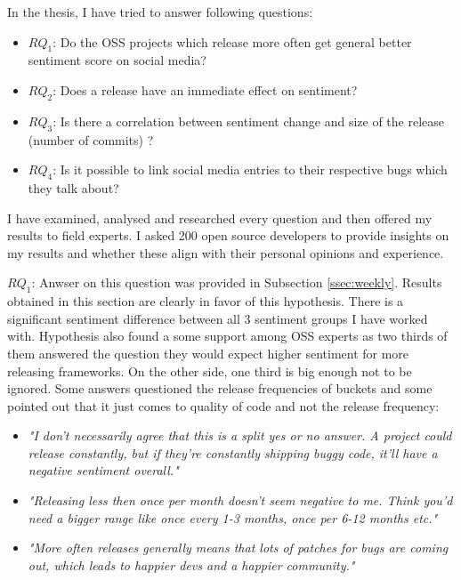 
In the thesis, I have tried to answer following questions:
\begin{itemize}
\item{\textbf{$RQ_{1}$}: Do the OSS projects which release more often get general better sentiment score on social media?}
\item{\textbf{$RQ_{2}$}: Does a release have an immediate effect on sentiment?}
\item{\textbf{$RQ_{3}$}: Is there a correlation between sentiment change and size of the release (number of commits) ?}
\item{\textbf{$RQ_{4}$}: Is it possible to link social media entries to their respective bugs which they talk about?}
\end{itemize}

I have examined, analysed and researched every question and then offered my results to field experts. I asked 200 open source developers to provide insights on my results and whether these align with their personal opinions and experience.

\textbf{$RQ_{1}$}: Anwser on this question was provided in Subsection  \ref{ssec:weekly}. Results obtained in this section are clearly in favor of this hypothesis. There is a significant sentiment difference between all 3 sentiment groups I have worked with. Hypothesis also found a some support among OSS experts as two thirds of them answered the question they would expect higher sentiment for more releasing frameworks. On the other side, one third is big enough not to be ignored. Some answers questioned the release frequencies of buckets and some pointed out that it just comes to quality of code and not the release frequency:

\begin{itemize}
\item \textit{"I don't necessarily agree that this is a split yes or no answer. A project could release constantly, but if they're constantly shipping buggy code, it'll have a negative sentiment overall."}
\item \textit{"Releasing less then once per month doesn't seem negative to me. Think you'd need a bigger range like once every 1-3 months, once per 6-12 months etc."}
\item \textit{"More often releases generally means that lots of patches for bugs are coming out, which leads to happier devs and a happier community."}
\end{itemize}

